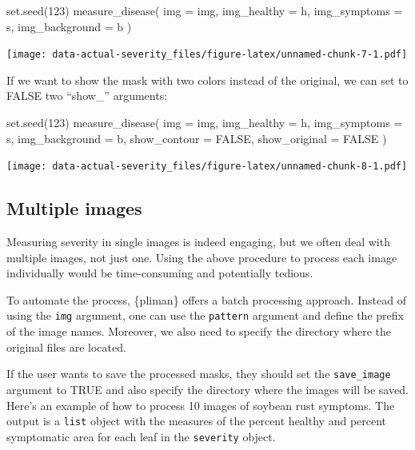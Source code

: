 \documentclass[
  letterpaper,
]{book}
\newenvironment{Shaded}{\begin{snugshade}}{\end{snugshade}}
\newcommand{\AttributeTok}[1]{\textcolor[rgb]{0.40,0.45,0.13}{#1}}
\newcommand{\ConstantTok}[1]{\textcolor[rgb]{0.56,0.35,0.01}{#1}}
\newcommand{\DecValTok}[1]{\textcolor[rgb]{0.68,0.00,0.00}{#1}}
\newcommand{\FunctionTok}[1]{\textcolor[rgb]{0.28,0.35,0.67}{#1}}
\newcommand{\NormalTok}[1]{\textcolor[rgb]{0.00,0.23,0.31}{#1}}
\begin{document}
\begin{Shaded}
\begin{Highlighting}[]
\FunctionTok{set.seed}\NormalTok{(}\DecValTok{123}\NormalTok{)}
\FunctionTok{measure\_disease}\NormalTok{(}
  \AttributeTok{img =}\NormalTok{ img,}
  \AttributeTok{img\_healthy =}\NormalTok{ h,}
  \AttributeTok{img\_symptoms =}\NormalTok{ s,}
  \AttributeTok{img\_background =}\NormalTok{ b}
\NormalTok{)}
\end{Highlighting}
\end{Shaded}

\texttt{[image: data-actual-severity\_files/figure-latex/unnamed-chunk-7-1.pdf]}

If we want to show the mask with two colors instead of the original, we
can set to FALSE two ``show\_'' arguments:

\begin{Shaded}
\begin{Highlighting}[]
\FunctionTok{set.seed}\NormalTok{(}\DecValTok{123}\NormalTok{)}
\FunctionTok{measure\_disease}\NormalTok{(}
  \AttributeTok{img =}\NormalTok{ img,}
  \AttributeTok{img\_healthy =}\NormalTok{ h,}
  \AttributeTok{img\_symptoms =}\NormalTok{ s,}
  \AttributeTok{img\_background =}\NormalTok{ b,}
  \AttributeTok{show\_contour =} \ConstantTok{FALSE}\NormalTok{,}
  \AttributeTok{show\_original =} \ConstantTok{FALSE}
\NormalTok{)}
\end{Highlighting}
\end{Shaded}

\texttt{[image: data-actual-severity\_files/figure-latex/unnamed-chunk-8-1.pdf]}

\hypertarget{multiple-images}{%
\subsection{Multiple images}\label{multiple-images}}

Measuring severity in single images is indeed engaging, but we often
deal with multiple images, not just one. Using the above procedure to
process each image individually would be time-consuming and potentially
tedious.

To automate the process, \{pliman\} offers a batch processing approach.
Instead of using the \texttt{img} argument, one can use the
\texttt{pattern} argument and define the prefix of the image names.
Moreover, we also need to specify the directory where the original files
are located.

If the user wants to save the processed masks, they should set the
\texttt{save\_image} argument to TRUE and also specify the directory
where the images will be saved. Here's an example of how to process 10
images of soybean rust symptoms. The output is a \texttt{list} object
with the measures of the percent healthy and percent symptomatic area
for each leaf in the \texttt{severity} object.
\end{document}
